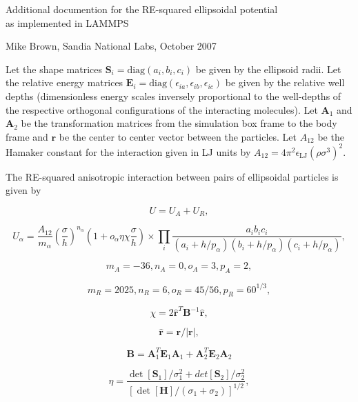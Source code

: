 


\begin{center}

\large{Additional documention for the RE-squared ellipsoidal potential \\
  as implemented in LAMMPS}

\end{center}

\centerline{Mike Brown, Sandia National Labs, October 2007}

\vspace{0.3in}

Let the shape matrices $\mathbf{S}_i=\mbox{diag}(a_i, b_i, c_i)$ be 
given by the ellipsoid radii. Let the relative energy matrices 
$\mathbf{E}_i = \mbox{diag} (\epsilon_{ia}, \epsilon_{ib}, 
\epsilon_{ic})$ be given by the relative well depths 
(dimensionless energy scales inversely proportional to the well-depths 
of the respective orthogonal configurations of the interacting molecules).
Let $\mathbf{A}_1$ and $\mathbf{A}_2$ be the transformation matrices 
from the simulation box frame to the body frame and $\mathbf{r}$ 
be the center to center vector between the particles. Let $A_{12}$ be 
the Hamaker constant for the interaction given in LJ units by
$A_{12}=4\pi^2\epsilon_{\mathrm{LJ}}(\rho\sigma^3)^2$.
 
\vspace{0.3in}

The RE-squared anisotropic interaction between pairs of 
ellipsoidal particles is given by

$$ U=U_A+U_R, $$

$$ U_\alpha=\frac{A_{12}}{m_\alpha}(\frac\sigma{h})^{n_\alpha}
(1+o_\alpha\eta\chi\frac\sigma{h}) \times \prod_i{
\frac{a_ib_ic_i}{(a_i+h/p_\alpha)(b_i+h/p_\alpha)(c_i+h/p_\alpha)}}, $$

$$ m_A=-36, n_A=0, o_A=3, p_A=2, $$

$$ m_R=2025, n_R=6, o_R=45/56, p_R=60^{1/3}, $$

$$ \chi = 2 \hat{\mathbf{r}}^T \mathbf{B}^{-1}
\hat{\mathbf{r}}, $$

$$ \hat{\mathbf{r}} = { \mathbf{r} } / |\mathbf{r}|, $$

$$ \mathbf{B} = \mathbf{A}_1^T \mathbf{E}_1 \mathbf{A}_1 +
\mathbf{A}_2^T \mathbf{E}_2 \mathbf{A}_2 $$

$$ \eta = \frac{ \det[\mathbf{S}_1]/\sigma_1^2+
det[\mathbf{S}_2]/\sigma_2^2}{[\det[\mathbf{H}]/
(\sigma_1+\sigma_2)]^{1/2}}, $$

